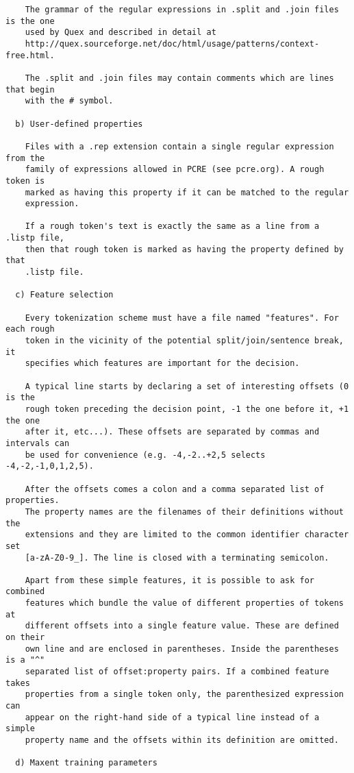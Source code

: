\begin{small}
\begin{verbatim}
    The grammar of the regular expressions in .split and .join files is the one
    used by Quex and described in detail at
    http://quex.sourceforge.net/doc/html/usage/patterns/context-free.html.

    The .split and .join files may contain comments which are lines that begin
    with the # symbol.

  b) User-defined properties

    Files with a .rep extension contain a single regular expression from the
    family of expressions allowed in PCRE (see pcre.org). A rough token is
    marked as having this property if it can be matched to the regular
    expression.

    If a rough token's text is exactly the same as a line from a .listp file,
    then that rough token is marked as having the property defined by that
    .listp file.

  c) Feature selection

    Every tokenization scheme must have a file named "features". For each rough
    token in the vicinity of the potential split/join/sentence break, it
    specifies which features are important for the decision.

    A typical line starts by declaring a set of interesting offsets (0 is the
    rough token preceding the decision point, -1 the one before it, +1 the one
    after it, etc...). These offsets are separated by commas and intervals can
    be used for convenience (e.g. -4,-2..+2,5 selects -4,-2,-1,0,1,2,5).

    After the offsets comes a colon and a comma separated list of properties.
    The property names are the filenames of their definitions without the
    extensions and they are limited to the common identifier character set
    [a-zA-Z0-9_]. The line is closed with a terminating semicolon.

    Apart from these simple features, it is possible to ask for combined
    features which bundle the value of different properties of tokens at
    different offsets into a single feature value. These are defined on their
    own line and are enclosed in parentheses. Inside the parentheses is a "^"
    separated list of offset:property pairs. If a combined feature takes
    properties from a single token only, the parenthesized expression can
    appear on the right-hand side of a typical line instead of a simple
    property name and the offsets within its definition are omitted.

  d) Maxent training parameters


\end{verbatim}
\end{small}
